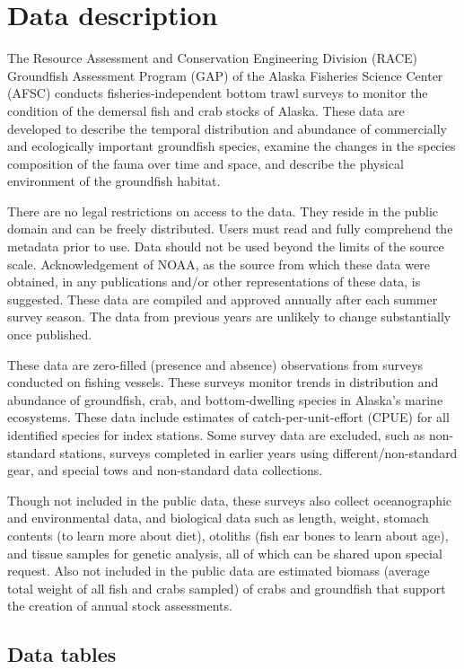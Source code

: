 \documentclass[
  letterpaper,
  oneside,
  open=any]{scrbook}
\begin{document}
\chapter{Data description}\label{data-description-3}

The Resource Assessment and Conservation Engineering Division (RACE)
Groundfish Assessment Program (GAP) of the Alaska Fisheries Science
Center (AFSC) conducts fisheries-independent bottom trawl surveys to
monitor the condition of the demersal fish and crab stocks of Alaska.
These data are developed to describe the temporal distribution and
abundance of commercially and ecologically important groundfish species,
examine the changes in the species composition of the fauna over time
and space, and describe the physical environment of the groundfish
habitat.

There are no legal restrictions on access to the data. They reside in
the public domain and can be freely distributed. Users must read and
fully comprehend the metadata prior to use. Data should not be used
beyond the limits of the source scale. Acknowledgement of NOAA, as the
source from which these data were obtained, in any publications and/or
other representations of these data, is suggested. These data are
compiled and approved annually after each summer survey season. The data
from previous years are unlikely to change substantially once published.

These data are zero-filled (presence and absence) observations from
surveys conducted on fishing vessels. These surveys monitor trends in
distribution and abundance of groundfish, crab, and bottom-dwelling
species in Alaska's marine ecosystems. These data include estimates of
catch-per-unit-effort (CPUE) for all identified species for index
stations. Some survey data are excluded, such as non-standard stations,
surveys completed in earlier years using different/non-standard gear,
and special tows and non-standard data collections.

Though not included in the public data, these surveys also collect
oceanographic and environmental data, and biological data such as
length, weight, stomach contents (to learn more about diet), otoliths
(fish ear bones to learn about age), and tissue samples for genetic
analysis, all of which can be shared upon special request. Also not
included in the public data are estimated biomass (average total weight
of all fish and crabs sampled) of crabs and groundfish that support the
creation of annual stock assessments.

\section{Data tables}\label{data-tables-2}
\end{document}
